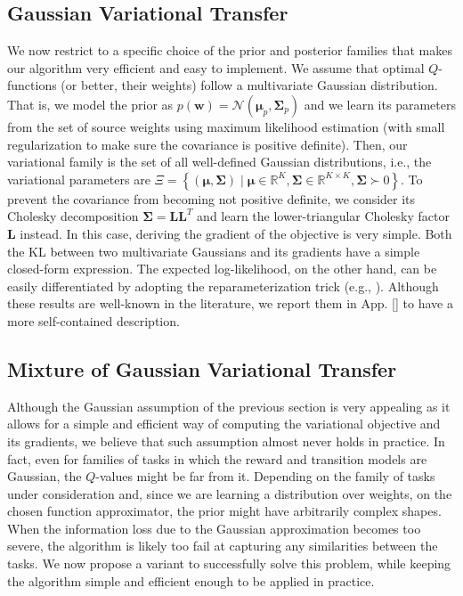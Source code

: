 \documentclass{article}
\begin{document}
\subsection{Gaussian Variational Transfer}\label{sec:gvt}

We now restrict to a specific choice of the prior and posterior families that makes our algorithm very efficient and easy to implement. We assume that optimal $Q$-functions (or better, their weights) follow a multivariate Gaussian distribution. That is, we model the prior as $p(\bm{w}) = \mathcal{N}(\bm{\mu}_p,\bm{\Sigma}_p)$ and we learn its parameters from the set of source weights using maximum likelihood estimation (with small regularization to make sure the covariance is positive definite). Then, our variational family is the set of all well-defined Gaussian distributions, i.e., the variational parameters are $\Xi = \left\{ (\bm{\mu},\bm{\Sigma}) \mid \bm{\mu}\in\mathbb{R}^K, \bm{\Sigma}\in\mathbb{R}^{K\times K}, \bm{\Sigma}\succ 0 \right\}$. To prevent the covariance from becoming not positive definite, we consider its Cholesky decomposition $\bm{\Sigma} = \bm{LL}^T$ and learn the lower-triangular Cholesky factor $\bm{L}$ instead. In this case, deriving the gradient of the objective is very simple. Both the KL between two multivariate Gaussians and its gradients have a simple closed-form expression. The expected log-likelihood, on the other hand, can be easily differentiated by adopting the reparameterization trick (e.g., \cite{hoffman2013stochastic,rezende2014stochastic}). Although these results are well-known in the literature, we report them in App. \ref{} to have a more self-contained description.

\subsection{Mixture of Gaussian Variational Transfer}\label{sec:mgvt}

Although the Gaussian assumption of the previous section is very appealing as it allows for a simple and efficient way of computing the variational objective and its gradients, we believe that such assumption almost never holds in practice. In fact, even for families of tasks in which the reward and transition models are Gaussian, the $Q$-values might be far from it. Depending on the family of tasks under consideration and, since we are learning a distribution over weights, on the chosen function approximator, the prior might have arbitrarily complex shapes. When the information loss due to the Gaussian approximation becomes too severe, the algorithm is likely too fail at capturing any similarities between the tasks. We now propose a variant to successfully solve this problem, while keeping the algorithm simple and efficient enough to be applied in practice.
\end{document}
